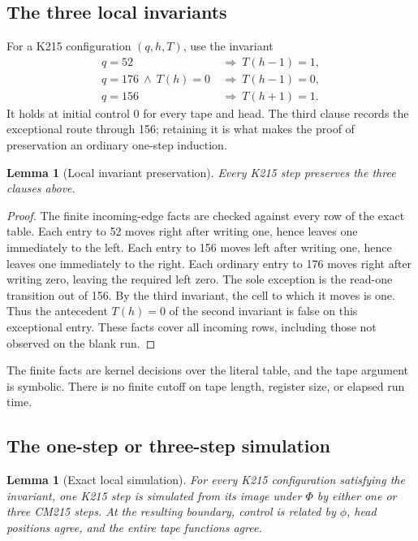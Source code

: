 \documentclass[11pt,letterpaper]{article}
\newtheorem{lemma}[theorem]{Lemma}
\theoremstyle{definition}\newtheorem{definition}[theorem]{Definition}
\theoremstyle{remark}\newtheorem{remark}[theorem]{Remark}
\begin{document}
\subsection{The three local invariants}

For a K215 configuration $(q,h,T)$, use the invariant
\begin{align*}
 q=52&\ \Longrightarrow\ T(h-1)=1,\\
 q=176\ \land\ T(h)=0&\ \Longrightarrow\ T(h-1)=0,\\
 q=156&\ \Longrightarrow\ T(h+1)=1.
\end{align*}
It holds at initial control 0 for every tape and head. The third clause
records the exceptional route through 156; retaining it is what makes the
proof of preservation an ordinary one-step induction.

\begin{lemma}[Local invariant preservation]
Every K215 step preserves the three clauses above.
\end{lemma}

\begin{proof}
The finite incoming-edge facts are checked against every row of the exact
table. Each entry to 52 moves right after writing one, hence leaves one
immediately to the left. Each entry to 156 moves left after writing one,
hence leaves one immediately to the right. Each ordinary entry to 176
moves right after writing zero, leaving the required left zero. The sole
exception is the read-one transition out of 156. By the third invariant,
the cell to which it moves is one. Thus the antecedent $T(h)=0$ of the
second invariant is false on this exceptional entry. These facts cover all
incoming rows, including those not observed on the blank run.
\end{proof}

The finite facts are kernel decisions over the literal table, and the tape
argument is symbolic. There is no finite cutoff on tape length, register
size, or elapsed run time.

\subsection{The one-step or three-step simulation}

\begin{lemma}[Exact local simulation]
For every K215 configuration satisfying the invariant, one K215 step is
simulated from its image under $\Phi$ by either one or three CM215 steps.
At the resulting boundary, control is related by $\phi$, head positions
agree, and the entire tape functions agree.
\end{lemma}
\end{document}
